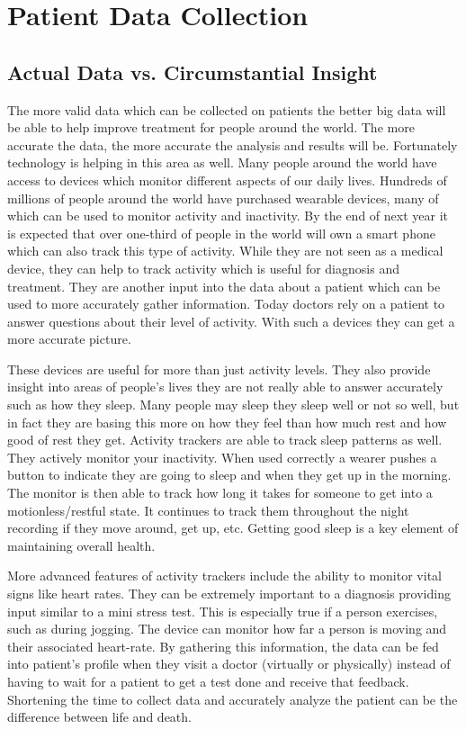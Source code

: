 \documentclass[sigconf]{acmart}
\begin{document}
\section{Patient Data Collection}
\subsection{Actual Data vs. Circumstantial Insight}
The more valid data which can be collected on patients the better big 
data will be able to help improve treatment for people around the world.  
The more accurate the data, the more accurate the analysis and results 
will be.  Fortunately technology is helping in this area as well.  
Many people around the world have access to devices which monitor 
different aspects of our daily lives.  Hundreds of millions of people 
around the world have purchased wearable devices, many of which can be 
used to monitor activity and inactivity\cite{StatistaWearable}.  By the 
end of next year it is expected that over one-third of people in the 
world will own a smart phone which can also track this type of 
activity\cite{StatistaPhones}.  While they are not seen as a medical 
device, they can help to track activity which is useful for diagnosis 
and treatment.  They are another input into the data about a patient 
which can be used to more accurately gather information.  Today doctors 
rely on a patient to answer questions about their level of activity.  
With such a devices they can get a more accurate picture.  

These devices are useful for more than just activity levels.  They 
also provide insight into areas of people's lives they are not really 
able to answer accurately such as how they sleep.  Many people may 
sleep they sleep well or not so well, but in fact they are basing this 
more on how they feel than how much rest and how good of rest they 
get.  Activity trackers are able to track sleep patterns as well.  They 
actively monitor your inactivity.  When used correctly a wearer pushes 
a button to indicate they are going to sleep and when they get up in 
the morning.  The monitor is then able to track how long it takes for 
someone to get into a motionless/restful state.  It continues to 
track them throughout the night recording if they move around, get up, 
etc.  Getting good sleep is a key element of maintaining overall 
health\cite{Health}.

More advanced features of activity trackers include the ability to 
monitor vital signs like heart rates.  They can be extremely important 
to a diagnosis providing input similar to a mini stress test.  This 
is especially true if a person exercises, such as during jogging.  The 
device can monitor how far a person is moving and their associated 
heart-rate.  By gathering this information, the data can be fed into 
patient's profile when they visit a doctor (virtually or physically) 
instead of having to wait for a patient to get a test done and receive 
that feedback.  Shortening the time to collect data and accurately 
analyze the patient can be the difference between life and death.
\end{document}
